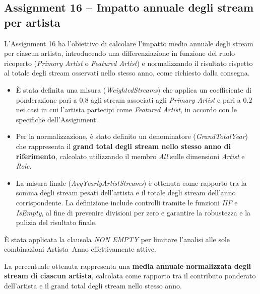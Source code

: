 \subsection*{Assignment 16 -- Impatto annuale degli stream per artista}

L’Assignment 16 ha l’obiettivo di calcolare l’impatto medio annuale degli stream
per ciascun artista, introducendo una differenziazione in funzione del ruolo
ricoperto (\textit{Primary Artist} o \textit{Featured Artist}) e normalizzando il
risultato rispetto al totale degli stream osservati nello stesso anno, come
richiesto dalla consegna.

\begin{itemize}
    \item È stata definita una misura (\textit{WeightedStreams}) che applica un
    coefficiente di ponderazione pari a $0.8$ agli stream associati agli
    \textit{Primary Artist} e pari a $0.2$ nei casi in cui l’artista partecipi come
    \textit{Featured Artist}, in accordo con le specifiche dell’Assignment.

    \item Per la normalizzazione, è stato definito un denominatore
    (\textit{GrandTotalYear}) che rappresenta il \textbf{grand total degli stream
    nello stesso anno di riferimento}, calcolato utilizzando il membro
    \textit{All} sulle dimensioni \textit{Artist} e \textit{Role}.

    \item La misura finale (\textit{AvgYearlyArtistStreams}) è ottenuta come
    rapporto tra la somma degli stream pesati dell’artista e il totale degli
    stream dell’anno corrispondente. La definizione include controlli tramite le
    funzioni \textit{IIF} e \textit{IsEmpty}, al fine di prevenire divisioni per
    zero e garantire la robustezza e la pulizia del risultato finale.
\end{itemize}

È stata applicata la clausola \textit{NON EMPTY} per limitare l’analisi alle sole
combinazioni Artista--Anno effettivamente attive.

La percentuale ottenuta rappresenta una \textbf{media annuale normalizzata degli
stream di ciascun artista}, calcolata come rapporto tra il contributo ponderato
dell’artista e il grand total degli stream nello stesso anno.
